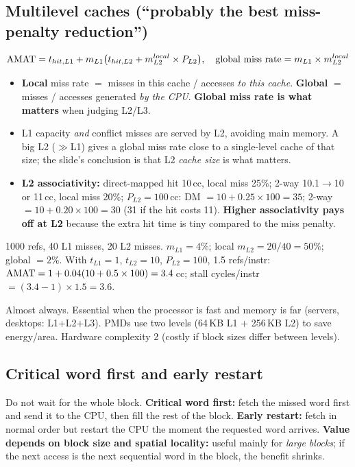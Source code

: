 \subsection{Multilevel caches (``probably the best miss-penalty reduction'')}
\[
\mathrm{AMAT}=t_{hit,L1}+m_{L1}\big(t_{hit,L2}+m_{L2}^{local}\times P_{L2}\big),\quad
\text{global miss rate}=m_{L1}\times m_{L2}^{local}
\]
\begin{itemize}
\item \textbf{Local} miss rate $=$ misses in this cache / accesses \emph{to this cache}. \textbf{Global} $=$ misses / accesses generated \emph{by the CPU}. \textbf{Global miss rate is what matters} when judging L2/L3.
\item L1 capacity \emph{and} conflict misses are served by L2, avoiding main memory. A big L2 ($\gg$L1) gives a global miss rate close to a single-level cache of that size; the slide's conclusion is that L2 \emph{cache size} is what matters.
\item \textbf{L2 associativity:} direct-mapped hit 10\,cc, local miss 25\%; 2-way 10.1$\to$10 or 11\,cc, local miss 20\%; $P_{L2}=100$\,cc: DM $=10+0.25\times100=35$; 2-way $=10+0.20\times100=30$ (31 if the hit costs 11). \textbf{Higher associativity pays off at L2} because the extra hit time is tiny compared to the miss penalty.
\end{itemize}
\begin{ex}
1000 refs, 40 L1 misses, 20 L2 misses. $m_{L1}=4\%$; local $m_{L2}=20/40=50\%$; global $=2\%$. With $t_{L1}=1$, $t_{L2}=10$, $P_{L2}=100$, 1.5 refs/instr: $\mathrm{AMAT}=1+0.04(10+0.5\times100)=3.4$\,cc; stall cycles/instr $=(3.4-1)\times1.5=3.6$.
\end{ex}
\begin{pick}
Almost always. Essential when the processor is fast and memory is far (servers, desktops: L1+L2+L3). PMDs use two levels (64\,KB L1 + 256\,KB L2) to save energy/area. Hardware complexity 2 (costly if block sizes differ between levels).
\end{pick}

\subsection{Critical word first and early restart}
Do not wait for the whole block. \textbf{Critical word first:} fetch the missed word first and send it to the CPU, then fill the rest of the block. \textbf{Early restart:} fetch in normal order but restart the CPU the moment the requested word arrives. \textbf{Value depends on block size and spatial locality:} useful mainly for \emph{large blocks}; if the next access is the next sequential word in the block, the benefit shrinks.

